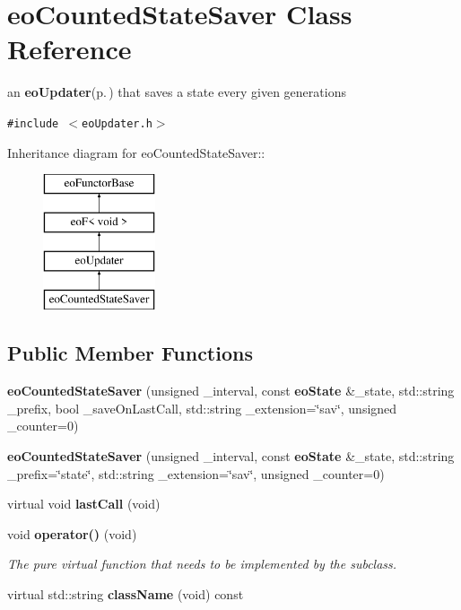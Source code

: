 \section{eo\-Counted\-State\-Saver Class Reference}
\label{classeo_counted_state_saver}
an {\bf eo\-Updater}{\rm (p.\,\pageref{classeo_updater})} that saves a state every given generations  


{\tt \#include $<$eo\-Updater.h$>$}

Inheritance diagram for eo\-Counted\-State\-Saver::\begin{figure}[H]
\begin{center}
\leavevmode
\includegraphics[height=4cm]{classeo_counted_state_saver}
\end{center}
\end{figure}
\subsection*{Public Member Functions}
\begin{CompactItemize}
\item 
{\bf eo\-Counted\-State\-Saver} (unsigned \_\-interval, const {\bf eo\-State} \&\_\-state, std::string \_\-prefix, bool \_\-save\-On\-Last\-Call, std::string \_\-extension=\char`\"{}sav\char`\"{}, unsigned \_\-counter=0)\label{classeo_counted_state_saver_a0}

\item 
{\bf eo\-Counted\-State\-Saver} (unsigned \_\-interval, const {\bf eo\-State} \&\_\-state, std::string \_\-prefix=\char`\"{}state\char`\"{}, std::string \_\-extension=\char`\"{}sav\char`\"{}, unsigned \_\-counter=0)\label{classeo_counted_state_saver_a1}

\item 
virtual void {\bf last\-Call} (void)\label{classeo_counted_state_saver_a2}

\item 
void {\bf operator()} (void)\label{classeo_counted_state_saver_a3}

\begin{CompactList}\small\item\em The pure virtual function that needs to be implemented by the subclass. \item\end{CompactList}\item 
virtual std::string {\bf class\-Name} (void) const \label{classeo_counted_state_saver_a4}

\end{CompactItemize}
